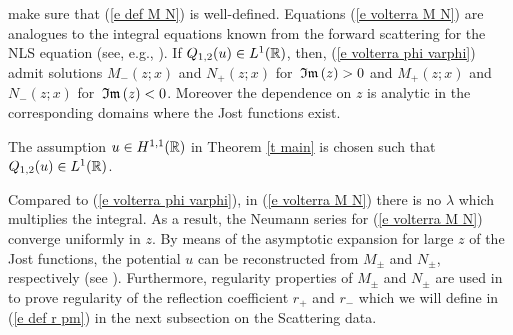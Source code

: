 make sure that (\ref{e def M N}) is well-defined.
Equations (\ref{e volterra M N}) are analogues to the integral equations known from the forward scattering for the NLS equation (see, e.g., \cite{Ablowitz2004}). If $Q_{1,2}(u)\in L^1(\mathbb R)$, then, (\ref{e volterra phi varphi}) admit solutions $M_-(z;x)$ and $N_+(z;x)$ for $\,\mathfrak{Im}\,(z)>0$ and $M_+(z;x)$ and $N_-(z;x)$ for $\,\mathfrak{Im}\,(z)<0$. Moreover the dependence on $z$ is analytic in the corresponding domains where the Jost functions exist.
\begin{rem}
    The assumption $u\in H^{1,1}(\mathbb R)$ in Theorem \ref{t main} is chosen such that $Q_{1,2}(u)\in L^1(\mathbb R)$.
\end{rem}
Compared to (\ref{e volterra phi varphi}), in (\ref{e volterra M N}) there is no $\lambda$ which multiplies the integral. As a result, the Neumann series for (\ref{e volterra M N}) converge uniformly in $z$.
By means of the asymptotic expansion for large $z$ of the Jost functions, the potential $u$ can be reconstructed from $M_{\pm}$ and $N_{\pm}$, respectively (see \cite[Lemma 2]{Pelinovsky2016}). Furthermore, regularity properties of $M_{\pm}$ and $N_{\pm}$ are used in \cite{Pelinovsky2016} to prove regularity of the reflection coefficient $r_+$ and $r_-$ which we will define in (\ref{e def r pm}) in the next subsection on the Scattering data.
